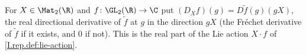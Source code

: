 For $X\in\Mat_2(\R)$ and $f\colon\GL_2(\R)\to\C$ put $(D_Xf)(g)=D\tilde f(g)(gX)$, the real directional derivative of $\tilde f$ at $g$ in the direction $gX$ (the Fr\'echet derivative of $\tilde f$ if it exists, and $0$ if not). This is the real part of the Lie action $X\cdot f$ of \cref{I.rep.def:lie-action}.
